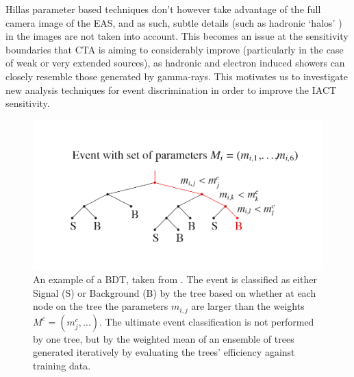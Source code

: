 Hillas parameter based techniques don't however take advantage of the full camera image of the EAS, and as such, subtle details (such as hadronic `halos' \cite{model++}) in the images are not taken into account. This becomes an issue at the sensitivity boundaries that CTA is aiming to considerably improve (particularly in the case of weak or very extended sources), as hadronic and electron induced showers can closely resemble those generated by gamma-rays. This motivates us to investigate new analysis techniques for event discrimination in order to improve the IACT sensitivity.

\begin{figure}[ht] 
        \centering \includegraphics[width=\columnwidth]{figures/forest_picture.png}
        \caption{
                \label{fig:network} %
                An example of a BDT, taken from \cite{hessbdt}. The event is classified as either Signal (S) or Background (B) by the tree based on whether at each node on the tree the parameters $m_{i,j}$ are larger than the weights $M^c=(m^c_j,...)$. The ultimate event classification is not performed by one tree, but by the weighted mean of an ensemble of trees generated iteratively by evaluating the trees' efficiency against training data.
        }
\end{figure}

